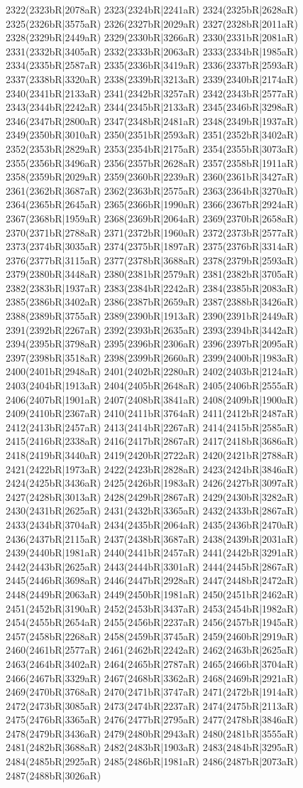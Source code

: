 2322(2323bR|2078aR) 2323(2324bR|2241aR) 2324(2325bR|2628aR) 2325(2326bR|3575aR) 2326(2327bR|2029aR) 2327(2328bR|2011aR) 2328(2329bR|2449aR) 2329(2330bR|3266aR) 2330(2331bR|2081aR) 2331(2332bR|3405aR) 2332(2333bR|2063aR) 2333(2334bR|1985aR) 2334(2335bR|2587aR) 2335(2336bR|3419aR) 2336(2337bR|2593aR) 2337(2338bR|3320aR) 2338(2339bR|3213aR) 2339(2340bR|2174aR) 2340(2341bR|2133aR) 2341(2342bR|3257aR) 2342(2343bR|2577aR) 2343(2344bR|2242aR) 2344(2345bR|2133aR) 2345(2346bR|3298aR) 2346(2347bR|2800aR) 2347(2348bR|2481aR) 2348(2349bR|1937aR) 2349(2350bR|3010aR) 2350(2351bR|2593aR) 2351(2352bR|3402aR) 2352(2353bR|2829aR) 2353(2354bR|2175aR) 2354(2355bR|3073aR) 2355(2356bR|3496aR) 2356(2357bR|2628aR) 2357(2358bR|1911aR) 2358(2359bR|2029aR) 2359(2360bR|2239aR) 2360(2361bR|3427aR) 2361(2362bR|3687aR) 2362(2363bR|2575aR) 2363(2364bR|3270aR) 2364(2365bR|2645aR) 2365(2366bR|1990aR) 2366(2367bR|2924aR) 2367(2368bR|1959aR) 2368(2369bR|2064aR) 2369(2370bR|2658aR) 2370(2371bR|2788aR) 2371(2372bR|1960aR) 2372(2373bR|2577aR) 2373(2374bR|3035aR) 2374(2375bR|1897aR) 2375(2376bR|3314aR) 2376(2377bR|3115aR) 2377(2378bR|3688aR) 2378(2379bR|2593aR) 2379(2380bR|3448aR) 2380(2381bR|2579aR) 2381(2382bR|3705aR) 2382(2383bR|1937aR) 2383(2384bR|2242aR) 2384(2385bR|2083aR) 2385(2386bR|3402aR) 2386(2387bR|2659aR) 2387(2388bR|3426aR) 2388(2389bR|3755aR) 2389(2390bR|1913aR) 2390(2391bR|2449aR) 2391(2392bR|2267aR) 2392(2393bR|2635aR) 2393(2394bR|3442aR) 2394(2395bR|3798aR) 2395(2396bR|2306aR) 2396(2397bR|2095aR) 2397(2398bR|3518aR) 2398(2399bR|2660aR) 2399(2400bR|1983aR) 2400(2401bR|2948aR) 2401(2402bR|2280aR) 2402(2403bR|2124aR) 2403(2404bR|1913aR) 2404(2405bR|2648aR) 2405(2406bR|2555aR) 2406(2407bR|1901aR) 2407(2408bR|3841aR) 2408(2409bR|1900aR) 2409(2410bR|2367aR) 2410(2411bR|3764aR) 2411(2412bR|2487aR) 2412(2413bR|2457aR) 2413(2414bR|2267aR) 2414(2415bR|2585aR) 2415(2416bR|2338aR) 2416(2417bR|2867aR) 2417(2418bR|3686aR) 2418(2419bR|3440aR) 2419(2420bR|2722aR) 2420(2421bR|2788aR) 2421(2422bR|1973aR) 2422(2423bR|2828aR) 2423(2424bR|3846aR) 2424(2425bR|3436aR) 2425(2426bR|1983aR) 2426(2427bR|3097aR) 2427(2428bR|3013aR) 2428(2429bR|2867aR) 2429(2430bR|3282aR) 2430(2431bR|2625aR) 2431(2432bR|3365aR) 2432(2433bR|2867aR) 2433(2434bR|3704aR) 2434(2435bR|2064aR) 2435(2436bR|2470aR) 2436(2437bR|2115aR) 2437(2438bR|3687aR) 2438(2439bR|2031aR) 2439(2440bR|1981aR) 2440(2441bR|2457aR) 2441(2442bR|3291aR) 2442(2443bR|2625aR) 2443(2444bR|3301aR) 2444(2445bR|2867aR) 2445(2446bR|3698aR) 2446(2447bR|2928aR) 2447(2448bR|2472aR) 2448(2449bR|2063aR) 2449(2450bR|1981aR) 2450(2451bR|2462aR) 2451(2452bR|3190aR) 2452(2453bR|3437aR) 2453(2454bR|1982aR) 2454(2455bR|2654aR) 2455(2456bR|2237aR) 2456(2457bR|1945aR) 2457(2458bR|2268aR) 2458(2459bR|3745aR) 2459(2460bR|2919aR) 2460(2461bR|2577aR) 2461(2462bR|2242aR) 2462(2463bR|2625aR) 2463(2464bR|3402aR) 2464(2465bR|2787aR) 2465(2466bR|3704aR) 2466(2467bR|3329aR) 2467(2468bR|3362aR) 2468(2469bR|2921aR) 2469(2470bR|3768aR) 2470(2471bR|3747aR) 2471(2472bR|1914aR) 2472(2473bR|3085aR) 2473(2474bR|2237aR) 2474(2475bR|2113aR) 2475(2476bR|3365aR) 2476(2477bR|2795aR) 2477(2478bR|3846aR) 2478(2479bR|3436aR) 2479(2480bR|2943aR) 2480(2481bR|3555aR) 2481(2482bR|3688aR) 2482(2483bR|1903aR) 2483(2484bR|3295aR) 2484(2485bR|2925aR) 2485(2486bR|1981aR) 2486(2487bR|2073aR) 2487(2488bR|3026aR) 
